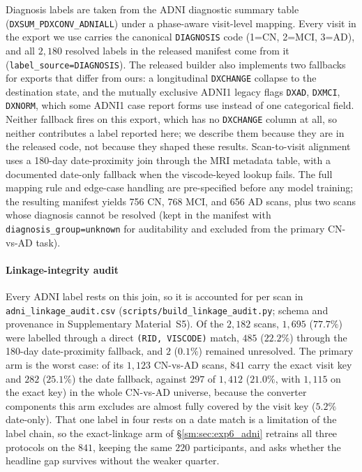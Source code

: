 \documentclass[11pt]{article}
\providecommand{\pb}{\discretionary{}{}{}}
\begin{document}
Diagnosis labels are taken from the ADNI diagnostic summary table
(\texttt{DXSUM\_PDXCONV\_ADNIALL}) under a phase-aware visit-level
mapping. Every visit in the export we use carries the canonical
\texttt{DIAGNOSIS} code (1=CN, 2=MCI, 3=AD), and all $2{,}180$ resolved
labels in the released manifest come from it
(\texttt{label\_source=DIAGNOSIS}). The released builder also
implements two fallbacks for exports that differ from ours: a
longitudinal \texttt{DXCHANGE} collapse to the destination state, and
the mutually exclusive ADNI1 legacy flags \texttt{DXAD},
\texttt{DXMCI}, \texttt{DXNORM}, which some ADNI1 case report forms
use instead of one categorical field. Neither fallback fires on this
export, which has no \texttt{DXCHANGE} column at all, so neither
contributes a label reported here; we describe them because they are in
the released code, not because they shaped these results. Scan-to-visit alignment uses a 180-day date-proximity join
through the MRI metadata table, with a documented date-only fallback
when the viscode-keyed lookup fails. The full mapping rule and edge-case
handling are pre-specified before any model training; the resulting
manifest yields 756 CN, 768 MCI, and 656 AD scans, plus two scans whose
diagnosis cannot be resolved (kept in the manifest with
\texttt{diagnosis\_group=unknown} for auditability and excluded from
the primary CN-vs-AD task).

\paragraph{Linkage-integrity audit}
Every ADNI label rests on this join, so it is accounted for per scan in
\texttt{adni\_linkage\_audit.csv} (\texttt{scripts/\pb build\_linkage\_audit.py};
schema and provenance in Supplementary Material~S5). Of the $2{,}182$ scans,
$1{,}695$ ($77.7\%$) were labelled through a direct \texttt{(RID, VISCODE)}
match, $485$ ($22.2\%$) through the 180-day date-proximity fallback, and $2$
($0.1\%$) remained unresolved. The primary arm is the worst case: of its
$1{,}123$ CN-vs-AD scans, $841$ carry the exact visit key and $282$ ($25.1\%$)
the date fallback, against $297$ of $1{,}412$ ($21.0\%$, with $1{,}115$ on the
exact key) in the whole CN-vs-AD universe, because the converter components
this arm excludes are almost fully covered by the visit key ($5.2\%$
date-only). That one label in four rests on a date match is a limitation of
the label chain, so the exact-linkage arm of \S\ref{sm:sec:exp6_adni} retrains
all three protocols on the $841$, keeping the same $220$ participants, and
asks whether the headline gap survives without the weaker quarter.
\end{document}
